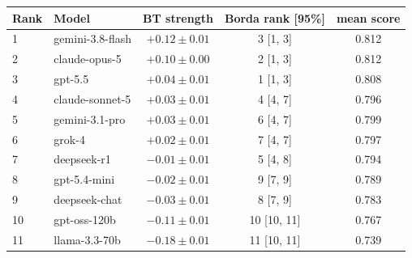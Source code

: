 \begin{tabular}{llccc}
\toprule
Rank & Model & BT strength & Borda rank [95\%] & mean score \\
\midrule
1 & gemini-3.8-flash & $+0.12 \pm 0.01$ & 3 [1, 3] & 0.812 \\
2 & claude-opus-5 & $+0.10 \pm 0.00$ & 2 [1, 3] & 0.812 \\
3 & gpt-5.5 & $+0.04 \pm 0.01$ & 1 [1, 3] & 0.808 \\
4 & claude-sonnet-5 & $+0.03 \pm 0.01$ & 4 [4, 7] & 0.796 \\
5 & gemini-3.1-pro & $+0.03 \pm 0.01$ & 6 [4, 7] & 0.799 \\
6 & grok-4 & $+0.02 \pm 0.01$ & 7 [4, 7] & 0.797 \\
7 & deepseek-r1 & $-0.01 \pm 0.01$ & 5 [4, 8] & 0.794 \\
8 & gpt-5.4-mini & $-0.02 \pm 0.01$ & 9 [7, 9] & 0.789 \\
9 & deepseek-chat & $-0.03 \pm 0.01$ & 8 [7, 9] & 0.783 \\
10 & gpt-oss-120b & $-0.11 \pm 0.01$ & 10 [10, 11] & 0.767 \\
11 & llama-3.3-70b & $-0.18 \pm 0.01$ & 11 [10, 11] & 0.739 \\
\bottomrule
\end{tabular}
